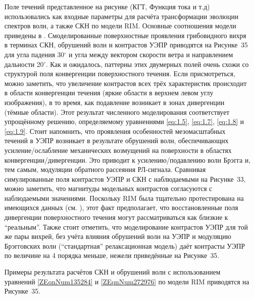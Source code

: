 {Поле течений представленное на рисунке (КГТ, Функция тока и т.д) использовались как входные параметры для расчёта трансформации эволюции спектров волн, а также СКН по модели RIM. Основные соотношения модели приведены в . Смоделированные поверхностные проявления грибовидного вихря в терминах СКН, обрушений волн и контрастов УЭПР приводятся на Рисунке~35 для угла падения 30${}^\circ$ и угла между вектором скорости ветра и направлением дальности 20${}^\circ$. Как и ожидалось, паттерны этих двумерных полей очень схожи со структурой поля конвергенции поверхностного течения. Если присмотреться, можно заметить, что увеличение контрастов всех трёх характеристик происходит в области конвергенции течения (яркие области в верхнем левом углу изображения), в то время, как подавление возникает в зонах дивергенции (тёмные области). Этот результат численного моделирования соответствует упрощённому решению, определяемому уравнениями \eqref{eq:1.5}, \eqref{eq:1.7}, \eqref{eq:1.8} и \eqref{eq:1.9}. Стоит напомнить, что проявления особенностей мезомасштабных течений в УЭПР возникает в результате обрушений волн, обеспечивающих усиление/ослабление механических возмущений на поверхности в областях конвергенции/дивергенции. Это приводит к усилению/подавлению волн Брэгга и, тем самым, модуляции обратного рассеяния РЛ-сигнала. Сравнивая симулированные поля контрастов УЭПР и СКН с наблюдаемыми на Рисунке~33, можно заметить, что магнитуды модельных контрастов согласуются с наблюдаемыми значениями. Поскольку RIM была тщательно протестирована на имеющихся данных (см. \citep{Kudryavtsev2005}), этот факт предполагает, что восстановленные поля дивергенции поверхностного течения могут рассматриваться как близкие к ``реальным''. Также стоит отметить, что моделирование контрастов УЭПР для той же пары вихрей, без учёта влияния обрушений волн на УЭПР и модуляцию Брэгговских волн (``стандартная'' релаксационная модель) даёт контрасты УЭПР по величине на 4 порядка меньше, нежели приведённые на Рисунке~35.

Примеры результата расчётов СКН и обрушений волн с использованием уравнений \eqref{ZEqnNum135284} и \eqref{ZEqnNum272976} по модели RIM приводятся на Рисунке~35.

}
